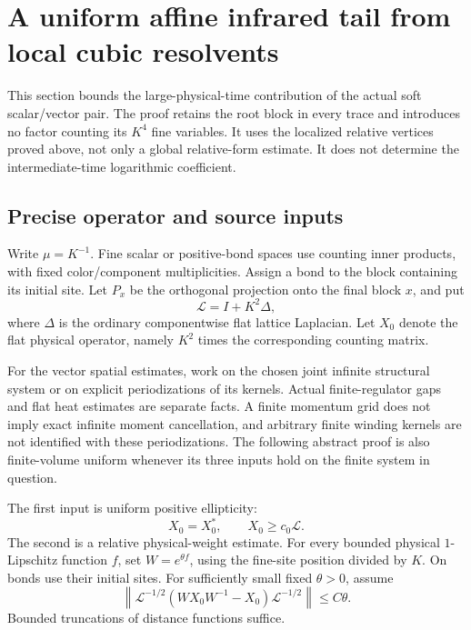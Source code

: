 \section{A uniform affine infrared tail from local cubic resolvents}
\label{sft-section}

This section bounds the large-physical-time contribution of the actual
soft scalar/vector pair. The proof retains the root block in every
trace and introduces no factor counting its \(K^4\) fine variables.
It uses the localized relative vertices proved above, not only a
global relative-form estimate. It does not determine the
intermediate-time logarithmic coefficient.

\subsection{Precise operator and source inputs}
\label{sft-input-section}

Write \(\mu=K^{-1}\). Fine scalar or positive-bond spaces use counting
inner products, with fixed color/component multiplicities. Assign a
bond to the block containing its initial site. Let \(P_x\) be the
orthogonal projection onto the final block \(x\), and put
\begin{equation}
 \mathcal L=I+K^2\Delta,
 \label{sft-reference}
\end{equation}
where \(\Delta\) is the ordinary componentwise flat lattice Laplacian.
Let \(X_0\) denote the flat physical operator, namely \(K^2\) times
the corresponding counting matrix.

For the vector spatial estimates, work on the chosen joint infinite
structural system or on explicit periodizations of its kernels.
Actual finite-regulator gaps and flat heat estimates are separate
facts. A finite momentum grid does not imply exact infinite moment
cancellation, and arbitrary finite winding kernels are not identified
with these periodizations. The following abstract proof is also
finite-volume uniform whenever its three inputs hold on the finite
system in question.

The first input is uniform positive ellipticity:
\begin{equation}
 X_0=X_0^*,\qquad X_0\ge c_0\mathcal L.
 \label{sft-ellipticity}
\end{equation}
The second is a relative physical-weight estimate. For every bounded
physical \(1\)-Lipschitz function \(f\), set \(W=e^{\theta f}\),
using the fine-site position divided by \(K\). On bonds use their
initial sites. For sufficiently small fixed \(\theta>0\), assume
\begin{equation}
 \left\|\mathcal L^{-1/2}
       (WX_0W^{-1}-X_0)\mathcal L^{-1/2}\right\|
       \le C\theta .
 \label{sft-weighted-input}
\end{equation}
Bounded truncations of distance functions suffice.

